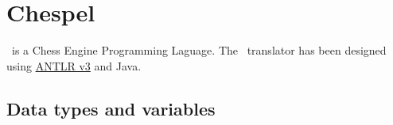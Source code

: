 \section{Chespel}

\chespel\ is a Chess Engine Programming Laguage. The \chespel\ translator has been designed using
\href{http://www.antlr.org}{ANTLR v3} and Java.

% 


\subsection{Data types and variables}









